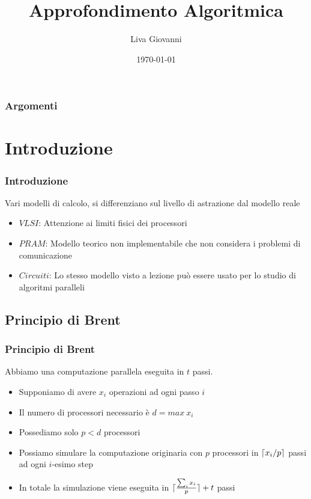 \documentclass{beamer}
\title[Parallel Computation]{Approfondimento Algoritmica} %
\author{Liva Giovanni} %
\institute[Udine] %
{
Università di Udine \\ %
\medskip
}
\date{\today} %
\DeclarePairedDelimiter{\ceil}{\lceil}{\rceil} %
\begin{document}
\begin{frame}
\titlepage %
\end{frame}

\begin{frame}
\frametitle{Argomenti} %
\tableofcontents %
\end{frame}

\section{Introduzione}

\begin{frame}
	\frametitle{Introduzione} %
	Vari modelli di calcolo, si differenziano sul livello di astrazione dal modello reale
	\begin{itemize}
		\item $VLSI$: Attenzione ai limiti fisici dei processori
		\item $PRAM$: Modello teorico non implementabile che non considera i problemi di comunicazione
		\item $Circuiti$: Lo stesso modello visto a lezione può essere usato per lo studio di algoritmi paralleli
	\end{itemize}
\end{frame}


\subsection{Principio di Brent}
\begin{frame}
	\frametitle{Principio di Brent} %
	Abbiamo una computazione parallela eseguita in $t$ passi.
	\begin{itemize}
		\item Supponiamo di avere $x_i$ operazioni ad ogni passo $i$
		\item Il numero di processori necessario è $d = max\ x_i$
		\item Possediamo solo $p<d$ processori
		\item Possiamo simulare la computazione originaria con $p$ processori in $\ceil{x_i / p}$ passi ad ogni $i$-esimo step
		\item In totale la simulazione viene eseguita in $\ceil{ \frac{\sum_i x_i}{p}    } + t$ passi
	\end{itemize}
\end{frame}
\end{document}
